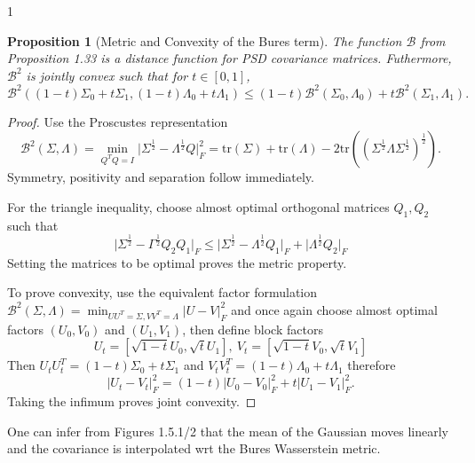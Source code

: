 \documentclass[12pt]{article}
\newtheorem{proposition}[theorem]{Proposition}
\theoremstyle{definition}
\theoremstyle{plain}
\begin{document}
\begin{spacing}{1}
\begin{proposition}[Metric and Convexity of the Bures term]
    The function $\mathcal{B}$ from Proposition 1.33 is a distance function for PSD covariance matrices. Futhermore, $\mathcal{B}^2$ is jointly convex such that for $t \in [0, 1]$,
    \[
    \mathcal{B}^2((1-t)\Sigma_0 + t\Sigma_1, (1-t)\Lambda_0 + t\Lambda_1) \leq (1-t)\mathcal{B}^2(\Sigma_0, \Lambda_0) + t\mathcal{B}^2(\Sigma_1, \Lambda_1).
    \]
\end{proposition}

\begin{proof}
    Use the Proscustes representation 
    \[
    \mathcal{B}^2(\Sigma, \Lambda) = \min_{Q^T Q = I} \lvert \Sigma^{\frac{1}{2}} - \Lambda^{\frac{1}{2}}Q \rvert_F^2 = \text{tr}(\Sigma) + \text{tr}(\Lambda) - 2\text{tr}((\Sigma^{\frac{1}{2}}\Lambda \Sigma^{\frac{1}{2}})^\frac{1}{2}).
    \]
    Symmetry, positivity and separation follow immediately.
    \newline
    
    For the triangle inequality, choose almost optimal orthogonal matrices $Q_1, Q_2$ such that
    \[
    \lvert \Sigma^{\frac{1}{2}} - \Gamma^{\frac{1}{2}}Q_2Q_1 \rvert_F \leq \lvert \Sigma^{\frac{1}{2}} - \Lambda^{\frac{1}{2}}Q_1 \rvert_F + \lvert \Lambda^\frac{1}{2}Q_2 \rvert_F
    \]
    Setting the matrices to be optimal proves the metric property.

    \newline
    To prove convexity, use the equivalent factor formulation $\mathcal{B}^2(\Sigma, \Lambda) = \min_{UU^T = \Sigma, VV^T = \Lambda} \rvert U - V \rvert_F^2$ and once again choose almost optimal factors $(U_0, V_0)$ and $(U_1, V_1)$, then define block factors 
    \[
    U_t = [\sqrt{1-t}U_0, \sqrt{t}U_1], \ V_t = [\sqrt{1-t}V_0, \sqrt{t}V_1]
    \]
    Then $U_tU_t^T = (1-t)\Sigma_0 + t\Sigma_1$ and $V_tV_t^T = (1-t)\Lambda_0 + t\Lambda_1$ therefore
    \[
    \lvert U_t - V_t \rvert_F^2 = (1-t) \lvert U_0 - V_0 \rvert_F^2 + t \lvert U_1 - V_1 \rvert_F^2.
    \]
    Taking the infimum proves joint convexity.
\end{proof}

One can infer from Figures 1.5.1/2 that the mean of the Gaussian moves linearly and the covariance is interpolated wrt the Bures Wasserstein metric.


\end{spacing}
\end{document}
